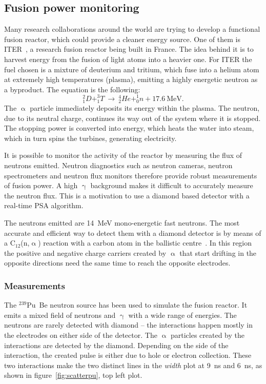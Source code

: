\clearpage
\subsection{Fusion power monitoring}
\label{sec:fusion}
Many research collaborations around the world are trying to develop a functional fusion reactor, which could provide a cleaner energy source. One of them is ITER~\cite{ITER:00000}, a research fusion reactor being built in France. The idea behind it is to harvest energy from the fusion of light atoms into a heavier one. For ITER the fuel chosen is a mixture of deuterium and tritium, which fuse into a helium atom at extremely high temperatures (plasma), emitting a highly energetic neutron as a byproduct. The equation is the following:
\begin{equation}
^2_1D+^3_1T ~\rightarrow~ ^4_2He+^1_0n+17.6~\textrm{MeV}.
\end{equation}
The $\upalpha$ particle immediately deposits its energy within the plasma. The neutron, due to its neutral charge, continues its way out of the system where it is stopped. The stopping power is converted into energy, which heats the water into steam, which in turn spins the turbines, generating electricity.

It is possible to monitor the activity of the reactor by measuring the flux of neutrons emitted. Neutron diagnostics such as neutron cameras, neutron spectrometers and neutron flux monitors therefore provide robust measurements of fusion power. A high $\upgamma$ background makes it difficult to accurately measure the neutron flux. This is a motivation to use a diamond based detector with a real-time PSA algorithm.

The neutrons emitted are 14~MeV mono-energetic fast neutrons. The most accurate and efficient way to detect them with a diamond detector is by means of a C$_\mathrm{12}$(n,$\upalpha$) reaction with a carbon atom in the ballistic centre~\cite{PAVEL:00001}. In this region the positive and negative charge carriers created by $\upalpha$ that start drifting in the opposite directions need the same time to reach the opposite electrodes.

\subsubsection{Measurements}
The $^{239}$Pu~Be neutron source has been used to simulate the fusion reactor. It emits a mixed field of neutrons and $\upgamma$ with a wide range of energies. The neutrons are rarely detected with diamond -- the interactions happen mostly in the electrodes on either side of the detector. The $\upalpha$ particles created by the interactions are detected by the diamond. Depending on the side of the interaction, the created pulse is either due to hole or electron collection. These two interactions make the two distinct lines in the \emph{width} plot at 9~ns and 6~ns, as shown in figure~\ref{fig:scatterpu}, top left plot. 


